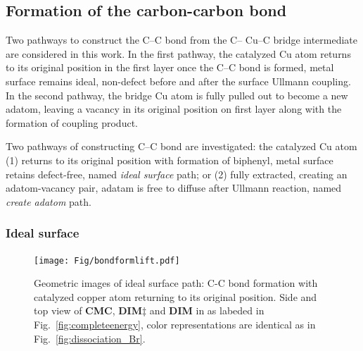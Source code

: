 \documentclass[%
 reprint,
 amsmath,amssymb,
 aps,
prb,
floatfix,
]{revtex4-2}
\newcommand{\lock}{\color{red}}
\newcommand{\lock}{\color{red}}
\newcommand{\comm}{\color{Purple}} %
\begin{document}

\subsection{Formation of the carbon-carbon bond}

{\lock
Two pathways to construct the C--C bond from the C-- Cu--C bridge intermediate are considered in this work. In the first pathway, the catalyzed Cu atom returns to its original position in the first layer once the C--C bond is formed, metal surface remains ideal, non-defect before and after the surface Ullmann coupling. In the second pathway, the bridge Cu atom is fully pulled out to become a new adatom, leaving a vacancy in its original position on first layer along with the formation of coupling product.
}

{\color{blue}
Two pathways of constructing C--C bond are investigated: the catalyzed Cu atom (1) returns to its original position with formation of biphenyl, metal surface retains defect-free, named \textit{ideal surface} path; or (2) fully extracted, creating an adatom-vacancy pair, adatam is free to diffuse after Ullmann reaction, named \textit{create adatom} path. 
}

\subsubsection{Ideal surface}


\begin{figure}[hbt]
\centering
\texttt{[image: Fig/bondformlift.pdf]}
\caption{Geometric images of ideal surface path: C-C bond formation with catalyzed copper atom returning to its original position. Side and top view of \textbf{CMC}, \textbf{DIM$\ddagger$} and \textbf{DIM} in as labeded in Fig.~\ref{fig:completeenergy}, color representations are identical as in Fig.~\ref{fig:dissociation_Br}.}
\label{fig:bondformlift}
\end{figure}
\end{document}
